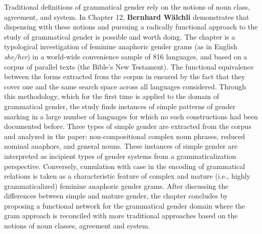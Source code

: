 \documentclass[output=collectionpaper]{langsci/langscibook}
\begin{document}
Traditional definitions of grammatical gender rely on the notions of noun class, agreement, and system. In Chapter 12, \textbf{Bernhard Wälchli} demonstrates that dispensing with these notions and pursuing a radically functional approach to the study of grammatical gender is possible and worth doing. The chapter is a typological investigation of feminine anaphoric gender grams (as in English \textit{she/her}) in a world-wide convenience sample of 816 languages, and based on a corpus of parallel texts (the Bible’s New Testament). The functional equivalence between the forms extracted from the corpus in ensured by the fact that they cover one and the same search space across all languages considered. Through this methodology, which for the first time is applied to the domain of grammatical gender, the study finds instances of simple patterns of gender marking in a large number of languages for which no such constructions had been documented before. Three types of simple gender are extracted from the corpus and analyzed in the paper: non-compositional complex noun phrases, reduced nominal anaphors, and general nouns. These instances of simple gender are interpreted as incipient types of gender systems from a grammaticalization perspective. Conversely, cumulation with case in the encoding of grammatical relations is taken as a characteristic feature of complex and mature (i.e., highly grammaticalized) feminine anaphoric gender grams. After discussing the differences between simple and mature gender, the chapter concludes by proposing a functional network for the grammatical gender domain where the gram approach is reconciled with more traditional approaches based on the notions of noun classes, agreement and system.
\end{document}
